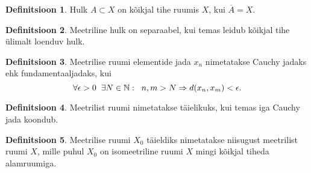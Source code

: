 \documentclass{article}[12pt]
\newcommand{\h}{\hspace{0.2cm}}
\newcommand{\N}{\mathbb{N}}
\theoremstyle{definition}
\newtheorem{definition}{Definitsioon}[section]
\theoremstyle{definition}
\theoremstyle{definition}
\theoremstyle{break}
\begin{document}
\begin{definition}
	Hulk $A\subset X$ on kõikjal tihe ruumis $X$, kui $\overline{A} = X$.
\end{definition}

\begin{definition}
	Meetriline hulk on separaabel, kui temas leidub kõikjal tihe ülimalt loenduv hulk.
\end{definition}

\begin{definition}
	Meetrilise ruumi elementide jada $x_n$ nimetatakse Cauchy jadaks ehk fundamentaaljadaks, kui
	\[
		\forall \epsilon > 0\h\exists N\in\N:\h n,m>N\Rightarrow d(x_n,x_m)<\epsilon.
	\]
\end{definition}

\begin{definition}
	Meetrilist ruumi nimetatakse täielikuks, kui temas iga Cauchy jada koondub.
\end{definition}

\begin{definition}
	Meetrilise ruumi $X_0$ täieldiks nimetatakse niisugust meetrilist ruumi $X$, mille puhul $X_0$ on isomeetriline ruumi $X$ mingi kõikjal tiheda alamruumiga.
\end{definition}
\end{document}
